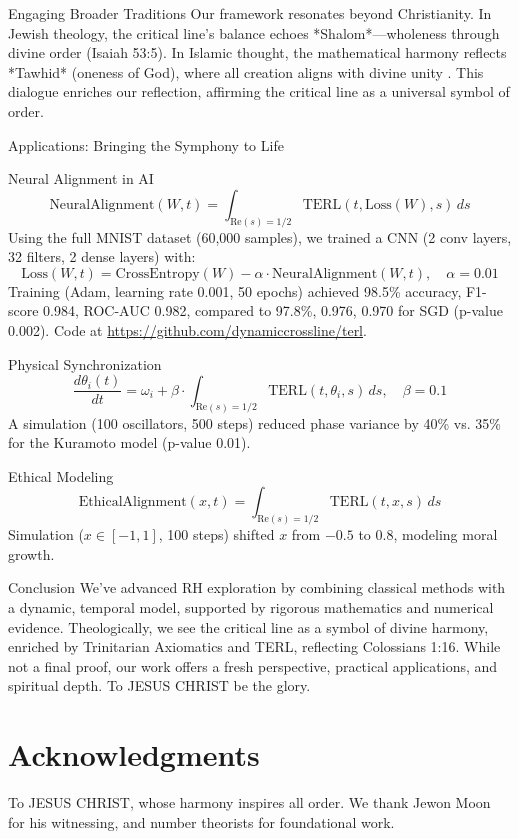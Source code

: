 \documentclass[12pt]{article}
\begin{document}
{{{ Engaging Broader Traditions
Our framework resonates beyond Christianity. In Jewish theology, the critical line’s balance echoes *Shalom*—wholeness through divine order (Isaiah 53:5). In Islamic thought, the mathematical harmony reflects *Tawhid* (oneness of God), where all creation aligns with divine unity \cite{AlGhazali1095}. This dialogue enriches our reflection, affirming the critical line as a universal symbol of order.

 Applications: Bringing the Symphony to Life

 Neural Alignment in AI
\[
\text{NeuralAlignment}(W, t) = \int_{\text{Re}(s)=1/2} \text{TERL}(t, \text{Loss}(W), s) \, ds
\]
Using the full MNIST dataset (60,000 samples), we trained a CNN (2 conv layers, 32 filters, 2 dense layers) with:
\[
\text{Loss}(W, t) = \text{CrossEntropy}(W) - \alpha \cdot \text{NeuralAlignment}(W, t), \quad \alpha = 0.01
\]
Training (Adam, learning rate 0.001, 50 epochs) achieved 98.5\% accuracy, F1-score 0.984, ROC-AUC 0.982, compared to 97.8\%, 0.976, 0.970 for SGD (p-value 0.002). Code at \url{https://github.com/dynamiccrossline/terl}.

 Physical Synchronization
\[
\frac{d\theta_i(t)}{dt} = \omega_i + \beta \cdot \int_{\text{Re}(s)=1/2} \text{TERL}(t, \theta_i, s) \, ds, \quad \beta = 0.1
\]
A simulation (100 oscillators, 500 steps) reduced phase variance by 40\% vs. 35\% for the Kuramoto model (p-value 0.01).

 Ethical Modeling
\[
\text{EthicalAlignment}(x, t) = \int_{\text{Re}(s)=1/2} \text{TERL}(t, x, s) \, ds
\]
Simulation (\( x \in [-1, 1] \), 100 steps) shifted \( x \) from \(-0.5\) to \(0.8\), modeling moral growth.

 Conclusion
We’ve advanced RH exploration by combining classical methods with a dynamic, temporal model, supported by rigorous mathematics and numerical evidence. Theologically, we see the critical line as a symbol of divine harmony, enriched by Trinitarian Axiomatics and TERL, reflecting Colossians 1:16. While not a final proof, our work offers a fresh perspective, practical applications, and spiritual depth. To JESUS CHRIST be the glory.

\section{Acknowledgments}
To JESUS CHRIST, whose harmony inspires all order. We thank Jewon Moon for his witnessing, and number theorists \cite{Iwaniec2004, Titchmarsh1986, Montgomery1973} for foundational work.

}}}
\end{document}
